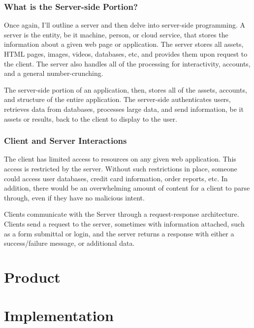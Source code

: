 \documentclass[11pt]{article}
\begin{document}
\subsubsection{What is the Server-side Portion?}
Once again, I'll outline a server and then delve into server-side programming. A server is the entity, be it machine, person, or cloud service, that stores the information about a given web page or application. The server stores all assets, HTML pages, images, videos, databases, etc, and provides them upon request to the client. The server also handles all of the processing for interactivity, accounts, and a general number-crunching.

The server-side portion of an application, then, stores all of the assets, accounts, and structure of the entire application. The server-side authenticates users, retrieves data from databases, processes large data, and send information, be it assets or results, back to the client to display to the user.

\subsubsection{Client and Server Interactions}
The client has limited access to resources on any given web application. This access is restricted by the server. Without such restrictions in place, someone could access user databases, credit card information, order reports, etc. In addition, there would be an overwhelming amount of content for a client to parse through, even if they have no malicious intent.

Clients communicate with the Server through a request-response architecture. Clients send a request to the server, sometimes with information attached, such as a form submittal or login, and the server returns a response with either a success/failure message, or additional data.

\section{Product}


\section{Implementation}
\end{document}
